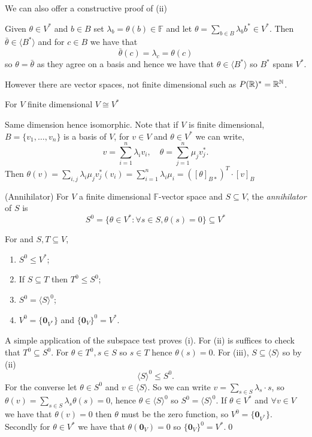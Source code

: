 \documentclass{article}
\newcommand{\F}{\mathbb{F}}
\begin{document}
We can also offer a constructive proof of (ii)\par
Given $ \theta\in V^* $ and $ b\in B $ set $ \lambda_b=\theta(b)\in \F $ and let $ \theta=\sum_{b\in B}\lambda_bb^*\in V^* $. Then $ \bar\theta\in \langle B^*\rangle $ and for $ c\in B $ we have that
\[
  \bar\theta(c)=\lambda_c=\theta(c)
\]
so $ \theta=\bar\theta $ as they agree on a basis and hence we have that $ \theta\in\langle B^*\rangle $ so $ B^* $ spans $ V^* $.\par
However there are vector spaces, not finite dimensional such as $ P(\mathbb{R})^*=\mathbb{R}^{\mathbb{N}} $.
\begin{corollary}
  For $ V $ finite dimensional $ V\cong V^* $
\end{corollary}
\pf Same dimension hence isomorphic.
Note that if $ V $ is finite dimensional, $ B=\{v_1,\dots, v_n\} $ is a basis of $ V $, for $ v\in V $ and $ \theta\in V^* $ we can write,
\[
	v=\sum_{i=1}^n\lambda_iv_i,\quad \theta=\sum_{j=1}^n\mu_jv_j^*.
\]
Then $ \theta(v) = \sum_{i,j}\lambda_i\mu_jv_j^*(v_i)=\sum_{i=1}^n\lambda_i\mu_i=([\theta]_{B*})^T\cdot [v]_B $
\begin{definition}
	(Annihilator) For $ V $ a finite dimensional $ \F $-vector space and $ S\subseteq V $, the \textit{annihilator} of $ S $ is
	\[
		S^0=\{\theta\in V^*:\forall s\in S,\theta(s)=0\}\subseteq V^*
	\]
\end{definition}
\begin{lemma}
  For and $ S,T\subseteq V $,
  \begin{enumerate}
	  \item $ S^0 \le V^* $;
	  \item If $ S\subseteq T $ then $ T^0\le S^0 $;
	  \item $ S^0=\langle S\rangle^0 $;
	  \item $ V^0=\{\mathbf 0_{V^*}\} $ and $ \{\mathbf 0_V\}^0=V^* $.
  \end{enumerate}
\end{lemma}
\pf A simple application of the subspace test proves (i). For (ii) is suffices to check that $ T^0\subseteq S^0 $. For $ \theta\in T^0 , s\in S	$ so $ s\in T $ hence $ \theta(s)=0 $. For (iii), $ S\subseteq \langle S\rangle $ so by (ii)
\[
  \langle S\rangle^0\le S^0.
\]
For the converse let $ \theta\in S^0 $ and $ v\in \langle S\rangle $. So we can write $ v=\sum_{s\in S}\lambda_s\cdot s $, so $ \theta(v)=\sum_{s\in S}\lambda_s\theta(s)=0 $, hence $ \theta\in\langle S\rangle^0 $ so $ S^0=\langle S\rangle^0 $. If $ \theta\in V^* $ and $ \forall v\in V $ we have that $ \theta(v)=0 $ then $ \theta $ must be the zero function, so $ V^0=\{\mathbf 0_{V^*}\} $. Secondly for $ \theta\in V^* $ we have that $ \theta(\mathbf 0_V)=0 $ so $ \{\mathbf 0_V\}^0=V^* $.\qed
\end{document}
